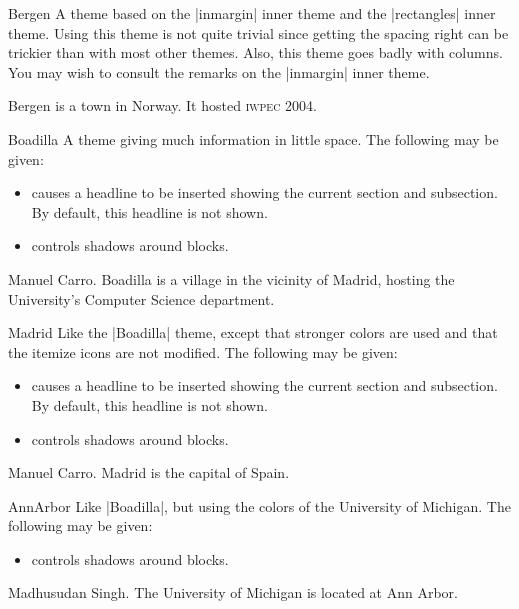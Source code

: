 \begin{themeexample}{Bergen}
  A theme based on the |inmargin| inner theme and the |rectangles| inner theme. Using this theme is not quite trivial since getting the spacing right can be trickier than with most other themes. Also, this theme goes badly with columns. You may wish to consult the remarks on the |inmargin| inner theme.

  Bergen is a town in Norway. It hosted \textsc{iwpec} 2004.
\end{themeexample}

\begin{themeexample}{Boadilla}
  A theme giving much information in little space. The following  may be given:
  \begin{itemize}
  \item {} causes a headline to be inserted showing the current section and subsection. By default, this headline is not shown.
  \item {} controls shadows around blocks.
  \end{itemize}

  \themeauthor Manuel Carro. Boadilla is a village in the vicinity of Madrid, hosting the University's Computer Science department.
\end{themeexample}

\begin{themeexample}{Madrid}
  Like the |Boadilla| theme, except that stronger colors are used and that the itemize icons are not modified. The following  may be given:
    \begin{itemize}
    \item {} causes a headline to be inserted showing the current section and subsection. By default, this headline is not shown.
    \item {} controls shadows around blocks.
    \end{itemize}

  \themeauthor Manuel Carro. Madrid is the capital of Spain.
\end{themeexample}

\begin{themeexample}{AnnArbor}
  Like |Boadilla|, but using the colors of the University of Michigan. The following  may be given:
  \begin{itemize}
  \item {} controls shadows around blocks.
  \end{itemize}

  \themeauthor Madhusudan Singh. The University of Michigan is located at Ann Arbor.
\end{themeexample}


